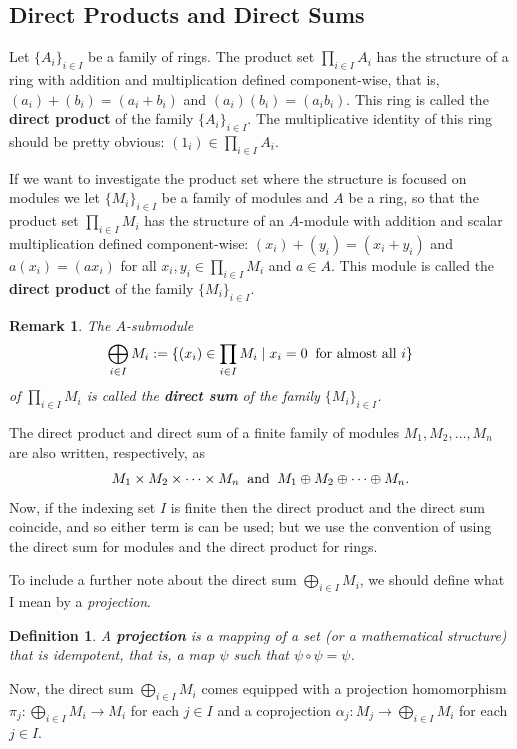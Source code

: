 \documentclass[12pt,reqno]{amsart}
\theoremstyle{plain}
\newtheorem{defi}{Definition}
\newtheorem{rem}{Remark}
\begin{document}
\subsection{Direct Products and Direct Sums}

Let $\{ A_i \}_{i \in I}$ be a family of rings. The product set $\prod_{i \in I} A_i$ has the structure of a ring with addition and multiplication defined component-wise, that is,  $(a_i) + (b_i) = (a_i + b_i)$ and $(a_i)(b_i) = (a_i b_i)$. This ring is called the \textbf{direct product} of the family $\{ A_i\}_{i \in I}$. The multiplicative identity of this ring should be pretty obvious: $(1_i) \in \prod_{i \in I} A_i$. 

If we want to investigate the product set where the structure is focused on modules we let $\{ M_i \}_{i \in I}$ be a family of modules and $A$ be a ring, so that the product set $\prod_{i \in I} M_i$ has the structure of an $A$-module with addition and scalar multiplication defined component-wise: $(x_i) + (y_i) = (x_i + y_i)$ and $a(x_i) = (ax_i)$ for all $x_i, y_i \in \prod_{i \in I} M_i$ and $a \in A$. This module is called the \textbf{direct product} of the family $\{ M_i \}_{i \in I}$. 

\begin{rem} The $A$-submodule 
$$ \bigoplus_{ i \in I} M_i  := \{ (x_i ) \in \prod_{i \in I} M_i \mid x_i = 0 \; \; \textup{for almost all $i$} \}$$ of $\prod_{i \in I} M_i$ is called the \textbf{direct sum} of the family $\{ M_i \}_{i \in I }$. 
\end{rem} 

The direct product and direct sum of a finite family of modules $M_1, M_2, \ldots, M_n$ are also written, respectively, as 
$$M_1 \times M_2 \times \cdots \times M_n \; \; \textup{and} \; \; M_1 \oplus M_2 \oplus \cdots \oplus M_n.$$
Now, if the indexing set $I$ is finite then the direct product and the direct sum coincide, and so either term is can be used; but we use the convention of using the direct sum for modules and the direct product for rings. 

To include a further note about the direct sum $\bigoplus_{i \in I} M_i$, we should define what I mean by a \textit{projection}. 
\begin{defi} A \textbf{projection} is a mapping of a set (or a mathematical structure) that is idempotent, that is, a map $\psi$ such that $\psi \circ \psi = \psi$. 
\end{defi} 

Now, the direct sum $\bigoplus_{i \in I} M_i$ comes equipped with a projection homomorphism $\pi_j \colon \bigoplus_{i \in I} M_i \to M_i$ for each $j \in I$ and a coprojection $\alpha_j \colon M_j \to \bigoplus_{i \in I} M_i$ for each $j \in I$.
\end{document}
